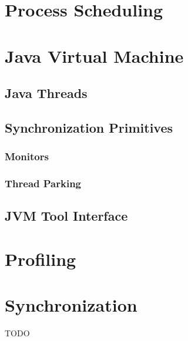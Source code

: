 
\section{Process Scheduling}








\section{Java Virtual Machine}

\subsection{Java Threads}

\subsection{Synchronization Primitives}

\subsubsection{Monitors}

\subsubsection{Thread Parking}

\subsection{JVM Tool Interface}

\section{Profiling}

\section{Synchronization}


TODO
